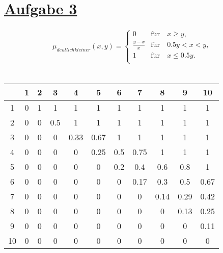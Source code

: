 \section*{\underline{Aufgabe 3}}

\begin{align*}
{{\mu }_{deutlich kleiner}}\left( x,y \right)=\left\{ 
\begin{array}{*{35}{l}}   
  0 & \mathrm f\ddot{\mathrm u}\mathrm r\ & x \ge y, \\ \frac{y-x}{x} & \mathrm f\ddot{\mathrm u}\mathrm r\ & 0.5 y < x < y, \\   
  1 & \mathrm f\ddot{\mathrm u}\mathrm r\ & x \le 0.5 y. \\  
\end{array} 
\right.
\end{align*}\\

\begin{tabular}{|c||c|c|c|c|c|c|c|c|c|c|}
  \hline 
   & 1 & 2 & 3 & 4 & 5 & 6 & 7 & 8 & 9 & 10 \\
  \hline\hline
 1  & 0 & 1 & 1 & 1 & 1 & 1 & 1 & 1 & 1 & 1 \\ 
  \hline
 2  & 0 & 0 & 0.5 & 1 & 1 & 1 & 1 & 1 & 1 & 1 \\ 
  \hline 
 3  & 0 & 0 & 0 & 0.33 & 0.67 & 1 & 1 & 1 & 1 & 1 \\ 
  \hline 
 4  & 0 & 0 & 0 & 0 & 0.25 & 0.5 & 0.75 & 1 & 1 & 1 \\ 
  \hline 
 5  & 0 & 0 & 0 & 0 & 0 & 0.2 & 0.4 & 0.6 & 0.8 & 1 \\ 
  \hline 
 6  & 0 & 0 & 0 & 0 & 0 & 0 & 0.17 & 0.3 & 0.5 & 0.67 \\ 
  \hline 
 7  & 0 & 0 & 0 & 0 & 0 & 0 & 0 & 0.14 & 0.29 & 0.42 \\ 
  \hline 
 8  & 0 & 0 & 0 & 0 & 0 & 0 & 0 & 0 & 0.13 & 0.25 \\ 
  \hline 
 9  & 0 & 0 & 0 & 0 & 0 & 0 & 0 & 0 & 0 & 0.11 \\ 
  \hline 
 10 & 0 & 0 & 0 & 0 & 0 & 0 & 0 & 0 & 0 & 0 \\ 
  \hline 
\end{tabular} 